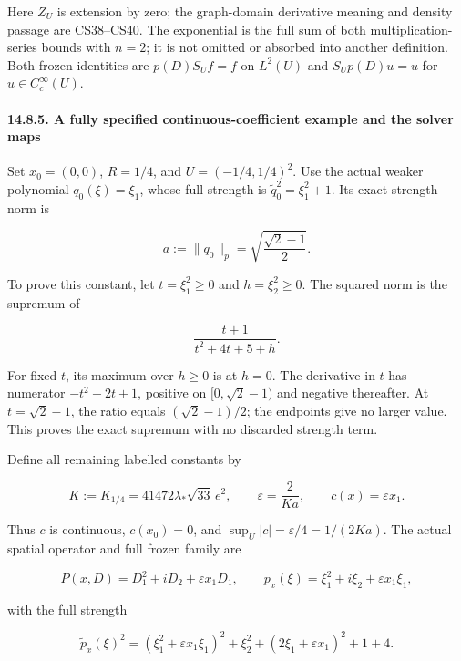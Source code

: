 \documentclass[
  11pt,
]{article}
\makeatletter
\let\ReaderOriginalAnchorStart\hyper@anchorstart
\let\ReaderOriginalAnchorEnd\hyper@anchorend
\let\ReaderPendingAliases\@empty
\def\ReaderArmAliases#1{\gdef\ReaderPendingAliases{#1}}
\def\hyper@anchorstart#1{\ReaderIfNativeAnchorTF{#1}{\ReaderPendingAliases\global\let\ReaderPendingAliases\@empty}{}\ReaderOriginalAnchorStart{#1}}
\makeatother
\begin{document}
Here \(Z_U\) is extension by zero; the graph-domain derivative meaning
and density passage are CS38--CS40. The exponential is the full sum of
both multiplication-series bounds with \(n=2\); it is not omitted or
absorbed into another definition. Both frozen identities are
\(p(D)S_Uf=f\) on \(L^2(U)\) and \(S_Up(D)u=u\) for
\(u\in C_c^\infty(U)\).

\ReaderArmAliases{\ReaderOriginalAnchorStart{a-fully-specified-continuous-coefficient-example-and-the-solver-maps}\ReaderOriginalAnchorEnd}
\paragraph{14.8.5. A fully specified continuous-coefficient example and
the solver
maps}\label{a-fully-specified-continuous-coefficient-example-and-the-solver-maps}

Set \(x_0=(0,0)\), \(R=1/4\), and \(U=(-1/4,1/4)^2\). Use the actual
weaker polynomial \(q_0(\xi)=\xi_1\), whose full strength is
\(\widetilde q_0^2=\xi_1^2+1\). Its exact strength norm is

\[
 a:=\|q_0\|_p=\sqrt{\frac{\sqrt2-1}{2}}.                      \tag{CE25}
\]

To prove this constant, let \(t=\xi_1^2\geq0\) and \(h=\xi_2^2\geq0\).
The squared norm is the supremum of

\[
 \frac{t+1}{t^2+4t+5+h}.
\]

For fixed \(t\), its maximum over \(h\geq0\) is at \(h=0\). The
derivative in \(t\) has numerator \(-t^2-2t+1\), positive on
\([0,\sqrt2-1)\) and negative thereafter. At \(t=\sqrt2-1\), the ratio
equals \((\sqrt2-1)/2\); the endpoints give no larger value. This proves
the exact supremum with no discarded strength term.

Define all remaining labelled constants by

\[
 K:=K_{1/4}=41472\lambda_*\sqrt{33}\,e^2,
 \qquad \varepsilon=\frac{2}{Ka},\qquad c(x)=\varepsilon x_1.   \tag{CE26}
\]

Thus \(c\) is continuous, \(c(x_0)=0\), and
\(\sup_U|c|=\varepsilon/4=1/(2Ka)\). The actual spatial operator and
full frozen family are

\[
 P(x,D)=D_1^2+iD_2+\varepsilon x_1D_1,
 \qquad p_x(\xi)=\xi_1^2+i\xi_2+\varepsilon x_1\xi_1,          \tag{CE27}
\]

with the full strength

\[
 \widetilde p_x(\xi)^2
 =(\xi_1^2+\varepsilon x_1\xi_1)^2+\xi_2^2
     +(2\xi_1+\varepsilon x_1)^2+1+4.                       \tag{CE28}
\]
\end{document}

